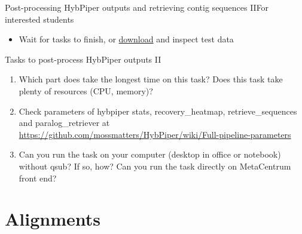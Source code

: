 \documentclass[compress, ucs, xelatex, 11pt, xcolor=x11names, aspectratio=169,
	hyperref={
		bookmarks=true,
		unicode=true,
		colorlinks=true,
		pdftitle={HybSeq course},
		plainpages=false,
		pdfauthor={Vojtech Zeisek},
		pdfsubject={Practical processing of HybSeq target enrichment sequencing data on computing grids like MetaCentrum},
		pdfcreator={XeLaTeX},
		pdfkeywords={BASH, command line, GNU, HybSeq, Linux, MetaCentrum, sequencing shell, target enrichment},
		linkcolor=Turquoise4, %
		anchorcolor=DodgerBlue4, %
		citecolor=DodgerBlue4, %
		filecolor=DodgerBlue4, %
		menucolor=Tan4, %
		urlcolor=DarkOliveGreen4, %
		pdftex},
	url={hyphens, lowtilde} %
	]{beamer}
\renewcommand{\texttt}[1]{\colorbox{Cornsilk2}{{\ttfamily #1}}}
\begin{document}
\begin{frame}{Post-processing HybPiper outputs and retrieving contig sequences II}{For interested students}
	\vfill
	\begin{itemize}
		\item Wait for tasks to finish, or \href{https://botany.natur.cuni.cz/zeisek/hybseq_course_zingibers_2_hybpiper.zip}{download} and inspect test data
	\end{itemize}
	\vfill
	\begin{exampleblock}{Tasks to post-process HybPiper outputs II}
		\begin{enumerate}
			\item Which part does take the longest time on this task? Does this task take plenty of resources (CPU, memory)?
			\item Check parameters of \texttt{hybpiper stats}, \texttt{recovery\_heatmap}, \texttt{retrieve\_sequences} and \texttt{paralog\_retriever} at \url{https://github.com/mossmatters/HybPiper/wiki/Full-pipeline-parameters}
			\item Can you run the task on your computer (desktop in office or notebook) without \texttt{qsub}? If so, how? Can you run the task directly on MetaCentrum front end?
		\end{enumerate}
	\end{exampleblock}
	\vfill
\end{frame}

\section{Alignments}
\end{document}
